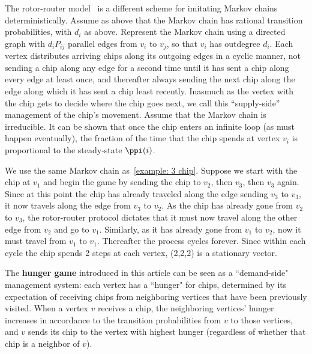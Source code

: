 The rotor-router model~\cite{holroyd2010rotor}
is a different scheme for imitating Markov chains deterministically.
Assume as above that the Markov chain
has rational transition probabilities, with $d_i$ as above.
Represent the Markov chain using a directed graph
with $d_i P_{ij}$ parallel edges from $v_i$ to $v_j$,
so that $v_i$ has outdegree $d_i$.
Each vertex distributes arriving chips along its outgoing edges in a cyclic manner, 
not sending a chip along any edge for a second time
until it has sent a chip along every edge at least once,
and thereafter always sending the next chip along 
the edge along which it has sent a chip least recently.
Inasmuch as the vertex with the chip gets to decide where the chip goes next,
we call this ``supply-side'' management of the chip's movement.
Assume that the Markov chain is irreducible.
It can be shown that once the chip enters an infinite loop
(as must happen eventually),
the fraction of the time that the chip spends at vertex $v_i$
is proportional to the steady-state $\ppi(i)$.

\begin{example}\label{example: 3 rotor}
We use the same Markov chain as~\cref{example: 3 chip}.
Suppose we start with the chip at $v_1$
and begin the game by sending the chip to $v_2$, then $v_3$, then $v_3$ again.
Since at this point the chip has already traveled 
along the edge sending $v_3$ to $v_3$,
it now travels along the edge from $v_3$ to $v_2$.
As the chip has already gone from $v_2$ to $v_3$,
the rotor-router protocol dictates
that it must now travel along the other edge from $v_2$ and go to $v_1$.
Similarly, as it has already gone from $v_1$ to $v_2$,
now it must travel from $v_1$ to $v_1$.
Thereafter the process cycles forever.
Since within each cycle
the chip spends 2 steps at each vertex,
(2,2,2) is a stationary vector.
\end{example}

The \textbf{hunger game} introduced in this article
can be seen as a ``demand-side" management system: 
each vertex has a ``hunger" for chips, 
determined by its expectation of receiving chips 
from neighboring vertices that have been previously visited.
When a vertex $v$ receives a chip, the neighboring vertices' hunger 
increases in accordance to the transition probabilities from $v$ 
to those vertices, and $v$ sends its chip to the vertex with highest hunger
(regardless of whether that chip is a neighbor of $v$).

